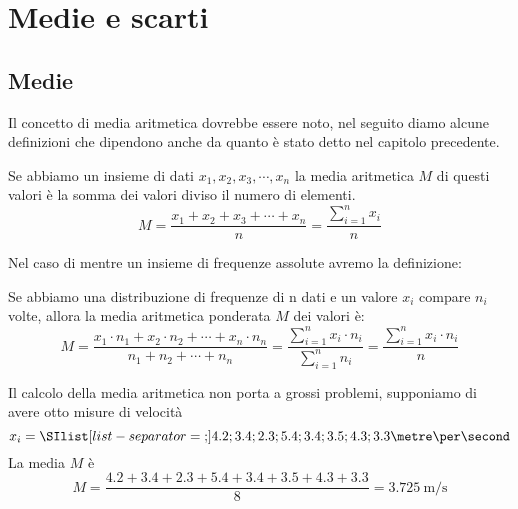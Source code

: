 \chapter{Medie e scarti}
\label{cha:MedieScarti}
\section{Medie}
Il concetto di media aritmetica dovrebbe essere noto, nel seguito diamo alcune definizioni che dipendono anche da quanto è stato detto nel capitolo precedente.
\begin{defn}
	Se abbiamo un insieme di dati $x_{1},x_{2},x_{3},\cdots,x_{n}$ la media aritmetica $M$ di questi valori  è  la somma dei valori diviso il numero di elementi.\[M=\dfrac{x_{1}+x_{2}+x_{3}+\cdots+x_{n}}{n}=\dfrac{\sum_{i=1}^{n}x_{i}}{n} \]
\end{defn}

Nel caso di mentre un insieme  di frequenze assolute avremo la definizione:
\begin{defn}
Se abbiamo una distribuzione di frequenze di n dati e un valore $x_{i}$ compare $n_{i}$ volte,  allora la media aritmetica ponderata  $M$ dei valori è: \[M=\dfrac{x_{1}\cdot n_{1}+x_{2}\cdot n_{2}+\cdots+x_{n}\cdot n_{n}}{n_{1}+n_{2}+\cdots+n_{n} }=\dfrac{\sum_{i=1}^{n}x_{i}\cdot n_{i}}{\sum_{i=1}^{n} n_{i}}=\dfrac{\sum_{i=1}^{n}x_{i}\cdot n_{i}}{n}\]
\end{defn}
Il calcolo della media aritmetica non porta a grossi problemi, supponiamo di avere otto misure di velocità \[x_{i}=\SIlist[list-separator = {;}]{4.2;3.4;2.3;5.4;3.4;3.5;4.3;3.3}{\metre\per\second}\] La media $M$ è \[M=\dfrac{\num{4.2}+\num{3.4}+\num{2.3}+\num{5.4}+\num{3.4}+\num{3.5}+\num{4.3}+\num{3.3}} {8}=\SI{3.725}{\metre\per\second}\]

